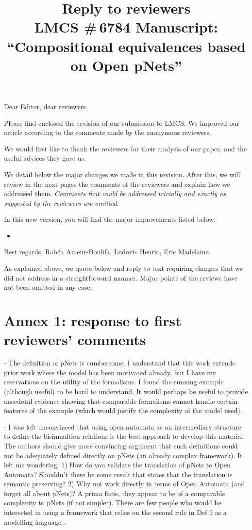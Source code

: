 \documentclass{article}
\title{Reply to reviewers\\
LMCS \#\,6784 Manuscript: \\``Compositional equivalences based on Open pNets'' }
\begin{document}
\maketitle
\noindent
Dear Editor, dear reviewers,

Please find enclosed the revision of our submission to LMCS. We improved our article according to the comments made by the
anonymous reviewers.

We would first like to thank the reviewers for their analysis of our
paper, and the useful advices they gave us.

We detail below the major changes we made in this revision. After
this, we will review in the next pages the comments of the reviewers
and explain how we addressed them.  \emph{Comments that could be
  addressed trivially and exactly as suggested by the reviewers are
  omitted}.  \bigskip

In this new version, you will find the major improvements listed below:
\begin{itemize}
\item 
\end{itemize}

\bigskip
\noindent
Best regards,
\newline
\noindent
Rab\'ea Ameur-Boulifa, Ludovic Henrio, Eric Madelaine.

\newpage
As explained above, we quote below and reply to text requiring changes that we did not 
address in a straightforward manner. Major points of the reviews have not been omitted in 
any case.

\section*{Annex 1: response to first reviewers' comments}
- The definition of pNets is cumbersome. I understand that this work extends prior work where the model has been motivated already, but I have my reservations on the utility of the formalisms.    I found the running example (although useful) to be hard to understand.  It would perhaps be useful to provide anecdotal evidence showing that comparable formalisms cannot handle certain features of the example (which would justify the complexity of the model used).

- I was left unconvinced that using open automata as an intermediary structure to define the bisimualtion relations is the best approach to develop this material.  The authors should give more convincing argument that such definitions could not be adequately defined directly on pNets (an already complex framework).  It left me wondering:
1) How do you validate the translation of pNets to Open Automata?  Shouldn't there be some result that states that the translation is semantic preserving?    
2) Why not work directly in terms of Open Automata (and forget all about pNets)?  A prima facie, they appear to be of a comparable complexity to pNets (if not simpler).  There are few people who would be interested in using a framework that relies on the second rule in Def 9 as a modelling language...  
\end{document}
